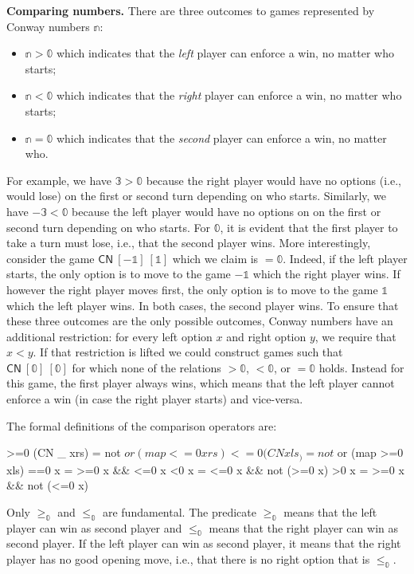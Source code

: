 \documentclass[authoryear,preprint]{sigplanconf}
\newcommand{\zerog}{\mathbb{0}}
\newcommand{\oneg}{\mathbb{1}}
\newcommand{\threeg}{\mathbb{3}}
\begin{document}
\smallskip\noindent\textbf{Comparing numbers.} There are three outcomes to
games represented by Conway numbers $\mathbb{n}$:
\begin{itemize}
\item $\mathbb{n} > \zerog$ which indicates that the \emph{left} player can
  enforce a win, no matter who starts;
\item $\mathbb{n} < \zerog$ which indicates that the \emph{right} player can
  enforce a win, no matter who starts;
\item $\mathbb{n} = \zerog$ which indicates that the \emph{second}
  player can enforce a win, no matter who.
\end{itemize}
For example, we have $\threeg > \zerog$ because the right player would have
no options (i.e., would lose) on the first or second turn depending on who
starts. Similarly, we have $-\threeg < \zerog$ because the left player would
have no options on on the first or second turn depending on who starts. For
$\zerog$, it is evident that the first player to take a turn must lose, i.e.,
that the second player wins. More interestingly, consider the game
$\textsf{CN}~[-\oneg]~[\oneg]$ which we claim is $= \zerog$. Indeed, if the
left player starts, the only option is to move to the game $-\oneg$ which the
right player wins. If however the right player moves first, the only option
is to move to the game $\oneg$ which the left player wins. In both cases, the
second player wins. To ensure that these three outcomes are the only possible
outcomes, Conway numbers have an additional restriction: for every left
option $x$ and right option $y$, we require that $x < y$. If that restriction
is lifted we could construct games such that $\textsf{CN}~[\zerog]~[\zerog]$
for which none of the relations $> \zerog$, $< \zerog$, or $= \zerog$
holds. Instead for this game, the first player always wins, which means that
the left player cannot enforce a win (in case the right player starts) and
vice-versa.

The formal definitions of the comparison operators are:
\begin{code}
>=0 (CN _ xrs)  = not $ or (map <=0 xrs)
<=0 (CN xls _)  = not $ or (map >=0 xls) 
==0 x           = >=0 x && <=0 x
<0 x            = <=0 x && not (>=0 x)
>0 x            = >=0 x && not (<=0 x)
\end{code}
Only $\geq_\zerog$ and $\leq_\zerog$ are fundamental. The predicate
$\geq_\zerog$ means that the left player can win as second player and
$\leq_\zerog$ means that the right player can win as second player. If the
left player can win as second player, it means that the right player has no
good opening move, i.e., that there is no right option that is $\leq_\zerog$.
\end{document}
